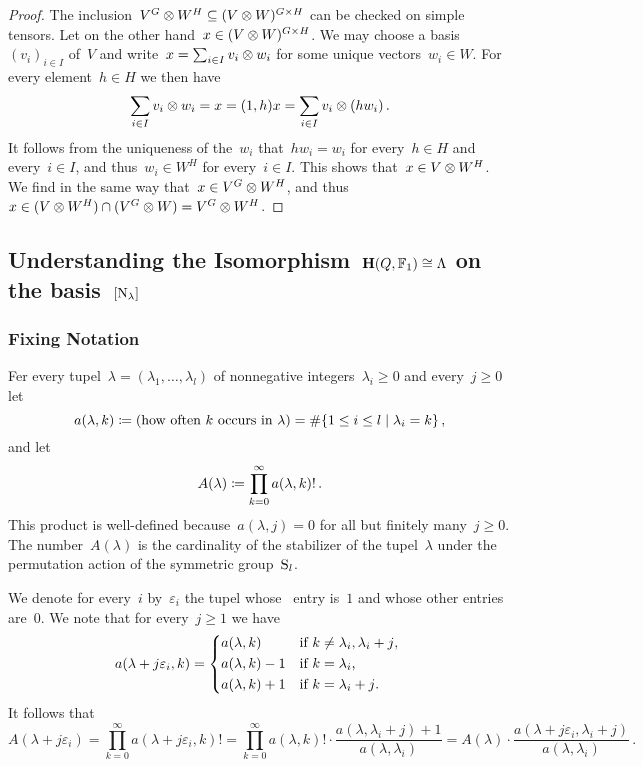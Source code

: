 \documentclass[a4paper,11pt]{scrartcl}
\begin{document}
\begin{proof}
  The inclusion~$V^G \otimes W^H \subseteq (V \otimes W)^{G \times H}$ can be checked on simple tensors.
  Let on the other hand~$x \in (V \otimes W)^{G \times H}$.
  We may choose a basis~$(v_i)_{i \in I}$ of~$V$ and write~$x = \sum_{i \in I} v_i \otimes w_i$ for some unique vectors~$w_i \in W$.
  For every element~$h \in H$ we then have
  \[
    \sum_{i \in I} v_i \otimes w_i
    =
    x
    =
    (1,h) x
    =
    \sum_{i \in I} v_i \otimes (h w_i) \,.
  \]
  It follows from the uniqueness of the~$w_i$ that~$h w_i = w_i$ for every~$h \in H$ and every~$i \in I$, and thus~$w_i \in W^H$ for every~$i \in I$.
  This shows that~$x \in V \otimes W^H$.
  We find in the same way that~$x \in V^G \otimes W^H$, and thus~$x \in (V \otimes W^H) \cap (V^G \otimes W) = V^G \otimes W^H$.
\end{proof}



\subsection{Understanding the Isomorphism~$\mathbf{H}(Q, \mathbb{F}_1) \cong \Lambda$ on the basis~$[ \mathrm{N}_\lambda ]$}
\label{understanding the iso on a basis}

\subsubsection{Fixing Notation}

Fer every tupel~$\lambda = (\lambda_1, \dotsc, \lambda_l)$ of nonnegative integers~$\lambda_i \geq 0$ and every~$j \geq 0$ let
\[
  a(\lambda, k)
  \defined
  ( \text{how often~$k$ occurs in~$\lambda$} )
  =
  \counting
  \{
    1 \leq i \leq l
  \suchthat
    \lambda_i = k
  \} \,,
\]
and let
\[
  A(\lambda)
  \coloneqq
  \prod_{k=0}^\infty a(\lambda, k)! \,.
\]
This product is well-defined because~$a(\lambda, j) = 0$ for all but finitely many~$j \geq 0$.
The number~$A(\lambda)$ is the cardinality of the stabilizer of the tupel~$\lambda$ under the permutation action of the symmetric group~$\mathrm{S}_l$.


We denote for every~$i$ by~$\varepsilon_i$ the tupel whose~ entry is~$1$ and whose other entries are~$0$.
We note that for every~$j \geq 1$ we have
\[
  a(\lambda + j \varepsilon_i, k)
  =
  \begin{cases*}
    a(\lambda, k)
    &
    if~$k \neq \lambda_i, \lambda_i + j$,
    \\
    a(\lambda, k) - 1
    &
    if~$k = \lambda_i$,
    \\
    a(\lambda, k) + 1
    &
    if~$k = \lambda_i + j$.
  \end{cases*}
\]
It follows that
\[
  A(\lambda + j \varepsilon_i)
  =
  \prod_{k=0}^\infty
  a(\lambda + j \varepsilon_i, k)!
  =
  \prod_{k=0}^\infty
  a(\lambda, k)!
  \cdot
  \frac
  {
    a(\lambda, \lambda_i + j) + 1
  }{
    a(\lambda, \lambda_i)
  }
  =
  A(\lambda)
  \cdot
  \frac
  {
    a(\lambda + j \varepsilon_i, \lambda_i + j)
  }{
    a(\lambda, \lambda_i)
  } \,.
\]
\end{document}
